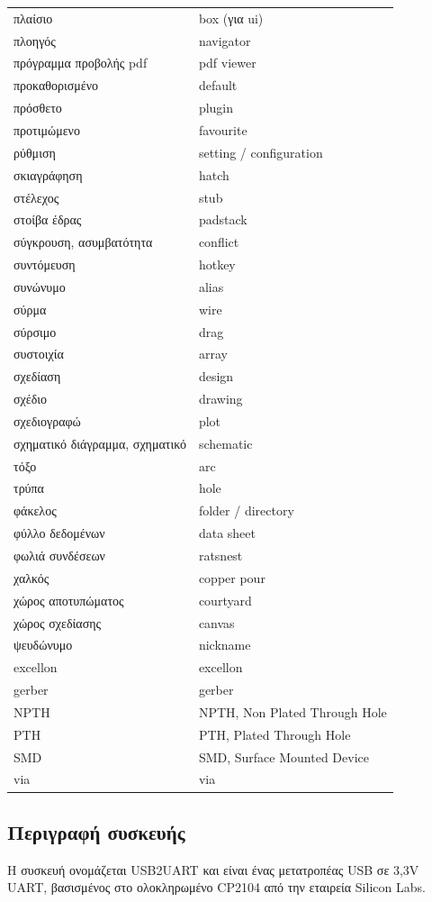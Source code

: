 \documentclass[a4paper]{article}
\begin{document}
\begin{longtabu}{ l l }
    πλαίσιο	&	box (για ui)	\\
    πλοηγός	&	navigator	\\
    πρόγραμμα προβολής pdf	&	pdf viewer	\\
    προκαθορισμένο	&	default	\\
    πρόσθετο	&	plugin	\\
    προτιμώμενο	&	favourite	\\
    ρύθμιση	&	setting / configuration	\\
    σκιαγράφηση	&	hatch	\\
    στέλεχος	&	stub	\\
    στοίβα έδρας	&	padstack	\\
    σύγκρουση, ασυμβατότητα	&	conflict	\\
    συντόμευση	&	hotkey	\\
    συνώνυμο	&	alias	\\
    σύρμα	&	wire	\\
    σύρσιμο	&	drag	\\
    συστοιχία	&	array	\\
    σχεδίαση	&	design	\\
    σχέδιο	&	drawing	\\
    σχεδιογραφώ	&	plot	\\
    σχηματικό διάγραμμα, σχηματικό	&	schematic	\\
    τόξο	&	arc	\\
    τρύπα	&	hole	\\
    φάκελος	&	folder / directory	\\
    φύλλο δεδομένων	&	data sheet	\\
    φωλιά συνδέσεων	&	ratsnest	\\
    χαλκός	&	copper pour	\\
    χώρος αποτυπώματος	&	courtyard	\\
    χώρος σχεδίασης	&	canvas	\\
    ψευδώνυμο	&	nickname	\\
    excellon	&	excellon	\\
    gerber	&	gerber	\\
    NPTH	&	NPTH, Non Plated Through Hole	\\
    PTH	&	PTH, Plated Through Hole  \\
    SMD	&	SMD, Surface Mounted Device	\\
    via	&	via	\\
\end{longtabu}

\subsection{Περιγραφή συσκευής}
Η συσκευή ονομάζεται USB2UART και είναι ένας μετατροπέας USB σε 3,3V UART, βασισμένος στο ολοκληρωμένο CP2104 από την εταιρεία Silicon Labs. 
\end{document}
